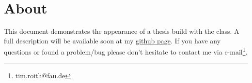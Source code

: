 \chapter{About}\label{ch:One}
This document demonstrates the appearance of a thesis build with the \texttt{\classname} 
class. A full description will be available soon at my 
\href{https://github.com/TimRoith}{github page}. 
If you have any questions or found a problem/bug please don't hesitate to contact me 
via e-mail\footnote{tim.roith@fau.de}.
